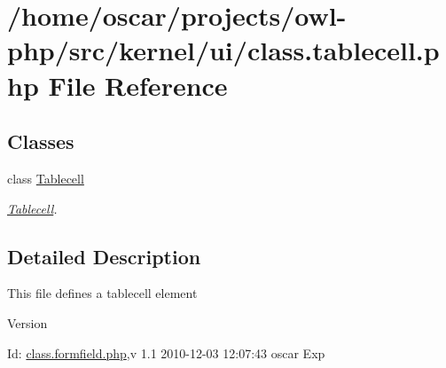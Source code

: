 \section{/home/oscar/projects/owl-\/php/src/kernel/ui/class.tablecell.php File Reference}
\label{class_8tablecell_8php}
\subsection*{Classes}
\begin{DoxyCompactItemize}
\item 
class \hyperlink{classTablecell}{Tablecell}
\begin{DoxyCompactList}\small\item\em \hyperlink{classTablecell}{Tablecell}. \item\end{DoxyCompactList}\end{DoxyCompactItemize}


\subsection{Detailed Description}
This file defines a tablecell element \begin{DoxyVersion}{Version}

\end{DoxyVersion}
\begin{DoxyParagraph}{Id:}
\hyperlink{class_8formfield_8php}{class.formfield.php},v 1.1 2010-\/12-\/03 12:07:43 oscar Exp 
\end{DoxyParagraph}
